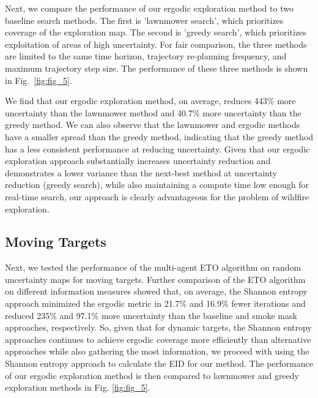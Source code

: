 \documentclass[letterpaper, 10 pt, conference]{ieeeconf}  %
\begin{document}
Next, we compare the performance of our ergodic exploration method to two baseline search methods. The first is 'lawnmower search', which prioritizes coverage of the exploration map. The second is 'greedy search', which prioritizes exploitation of areas of high uncertainty. For fair comparison, the three methods are limited to the same time horizon, trajectory re-planning frequency, and maximum trajectory step size. The performance of these three methods is shown in Fig.~\ref{fig:fig_5}.

We find that our ergodic exploration method, on average, reduces 443\% more uncertainty than the lawnmower method and 40.7\% more uncertainty than the greedy method. We can also observe that the lawnmower and ergodic methods have a smaller spread than the greedy method, indicating that the greedy method has a less consistent performance at reducing uncertainty. Given that our ergodic exploration approach substantially increases uncertainty reduction and demonstrates a lower variance than the next-best method at uncertainty reduction (greedy search), while also maintaining a compute time low enough for real-time search, our approach is clearly advantageous for the problem of wildfire exploration.

\subsection{Moving Targets}
Next, we tested the performance of the multi-agent ETO algorithm on random uncertainty maps for moving targets. Further comparison of the ETO algorithm on different information measures showed that, on average, the Shannon entropy approach minimized the ergodic metric in 21.7\% and 16.9\% fewer iterations and reduced 235\% and 97.1\% more uncertainty than the baseline and smoke mask approaches, respectively. So, given that for dynamic targets, the Shannon entropy approaches continues to achieve ergodic coverage more efficiently than alternative approaches while also gathering the most information, we proceed with using the Shannon entropy approach to calculate the EID for our method. The performance of our ergodic exploration method is then compared to lawnmower and greedy exploration methods in Fig. \ref{fig:fig_5}. 

\end{document}
